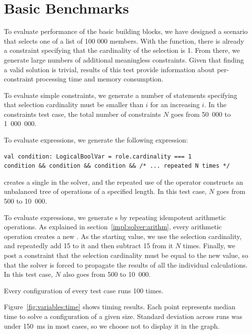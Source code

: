 \section{Basic Benchmarks}
\label{eval:variables}

To evaluate performance of the basic building blocks, we have designed a scenario that
selects one of a list of 100 000 members. With the  function, there is already
a constraint specifying that the cardinality of the selection is 1. From there, we
generate large numbers of additional meaningless constraints. Given that finding a valid
solution is trivial, results of this test provide information about per-constraint
processing time and memory consumption.

\medskip

To evaluate simple constraints, we generate a number of  statements
specifying that selection cardinality must be smaller than $i$ for an increasing $i$. In
the constraints test case, the total number of constraints $N$ goes from 50~000 to
1~000~000.

\medskip

To evaluate  expressions, we generate the following expression:
\begin{lstlisting}[style=snippet]
val condition: LogicalBoolVar = role.cardinality === 1
condition && condition && condition && /* ... repeated N times */
\end{lstlisting}
 creates a single  in the solver, and the repeated use of the
\dop{&&} operator constructs an unbalanced tree of  operations of a specified
length. In this test case, $N$ goes from 500 to 10~000.

\medskip

To evaluate  expressions, we generate s by repeating idempotent
arithmetic operations. As explained in section~\ref{impl:solver:arithm}, every
arithmetic operation creates a new . As the starting value, we use the
selection cardinality, and repeatedly add 15 to it and then subtract 15 from it $N$
times. Finally, we post a constraint that the selection cardinality must be equal to the
new value, so that the solver is forced to propagate the results of all the individual
calculations. In this test case, $N$ also goes from 500 to 10~000.

Every configuration of every test case runs 100 times.

\medskip

Figure~\ref{fig:variables:time} shows timing results. Each point represents median time
to solve a configuration of a given size. Standard deviation across runs was under
150~ms in most cases, so we choose not to display it in the graph.

